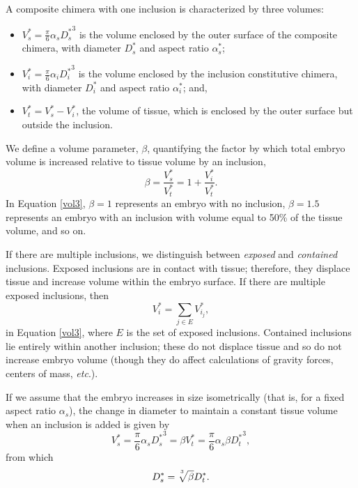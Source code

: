 \documentclass[10pt,a4paper]{article}
\def\etc{\emph{etc}.\xspace}
\begin{document}
A composite chimera with one inclusion is characterized by three volumes:
\begin{itemize}
	\item $V_s^* = \frac{\pi}{6} \alpha_s {D_s^*}^3$ is the volume enclosed by the outer surface of the composite chimera, with diameter $D_s^*$ and aspect ratio $\alpha_s^*$;
	\item $V_i^* = \frac{\pi}{6} \alpha_i {D_i^*}^3$ is the volume enclosed by the inclusion constitutive chimera, with diameter $D_i^*$ and aspect ratio $\alpha_i^*$; and,
	\item $V_t^* = V_s^* - V_i^*$, the volume of tissue, which is enclosed by the outer surface but outside the inclusion. 
\end{itemize}
We define a volume parameter, $\beta$, quantifying the factor by which total embryo volume is increased relative to tissue volume by an inclusion,
\begin{equation}\label{vol3}
	\beta = \frac{V_s^*}{V_t^*} = 1 + \frac{V_i^*}{V_t^*}.
\end{equation}
In Equation \ref{vol3}, $\beta = 1$ represents an embryo with no inclusion, $\beta = 1.5$ represents an embryo with an inclusion with volume equal to 50\% of the tissue volume, and so on.

If there are multiple inclusions, we distinguish between \textit{exposed} and \textit{contained} inclusions. 
Exposed inclusions are in contact with tissue; therefore, they displace tissue and increase volume within the embryo surface.  
If there are multiple exposed inclusions, then 
\begin{equation}\label{eqn:expincl}
	V_i^* = \sum_{j \in E} V^*_{i_j},
\end{equation}
in  Equation \ref{vol3}, where $E$ is the set of exposed inclusions.
Contained inclusions lie entirely within another inclusion; these do not displace tissue and so do not increase embryo volume (though they do affect calculations of gravity forces, centers of mass, \etc).


If we assume that the embryo increases in size isometrically (that is, for a fixed aspect ratio $\alpha_s$), the change in diameter to maintain a constant tissue volume when an inclusion is added is given by
\begin{equation}\label{vol4}
	V_s^*  = \frac{\pi}{6} \alpha_s {D_s^*}^3 = \beta V_t^* = \frac{\pi}{6} \alpha_s \beta {D_t^*}^3,
\end{equation} 
from which 
\begin{equation}\label{vol5}
	D_s^* = \sqrt[\uproot{5}3]{\beta} D_t^*.
\end{equation}
\end{document}

